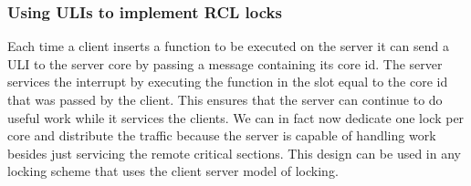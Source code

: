 \subsubsection{Using ULIs to implement RCL locks}

Each time a client inserts a function to be executed on the server it can send a
ULI to the server core by passing a message containing its core id. The server
services the interrupt by executing the function in the slot equal to the core
id that was passed by the client. This ensures that the server can continue to
do useful work while it services the clients. We can in fact now dedicate one
lock per core and distribute the traffic because the server is capable of
handling work besides just servicing the remote critical sections. This design
can be used in any locking scheme that uses the client server model of locking.

